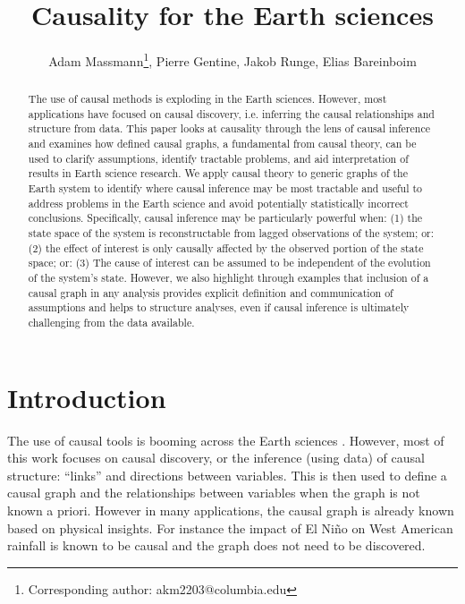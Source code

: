 \documentclass[12pt]{article}
\begin{document}
\title{Causality for the Earth sciences}

\author{Adam Massmann\thanks{Corresponding author:
    akm2203@columbia.edu}, Pierre Gentine, Jakob Runge, Elias Bareinboim}

\maketitle
\begin{abstract}
  The use of causal methods is exploding in the Earth
  sciences. However, most applications have focused on causal
  discovery, i.e. inferring the causal relationships and structure
  from data. This paper looks at causality through the lens of causal
  inference and examines how defined causal graphs, a fundamental from
  causal theory, can be used to clarify assumptions, identify
  tractable problems, and aid interpretation of results in Earth
  science research. We apply causal theory to generic graphs of the
  Earth system to identify where causal inference may be most
  tractable and useful to address problems in the Earth science and
  avoid potentially statistically incorrect conclusions. Specifically,
  causal inference may be particularly powerful when: (1) the state
  space of the system is reconstructable from lagged observations of
  the system; or: (2) the effect of interest is only causally affected
  by the observed portion of the state space; or: (3) The cause of
  interest can be assumed to be independent of the evolution of the
  system’s state. However, we also highlight through examples that
  inclusion of a causal graph in any analysis provides explicit
  definition and communication of assumptions and helps to structure
  analyses, even if causal inference is ultimately challenging from
  the data available.
\end{abstract}

\section{Introduction}

The use of causal tools is booming across the Earth sciences
\citep[e.g.,][]{salvucci2002, ebert-uphoff2012,
  samarasinghe-casuality,runge-causal-timeseries,runge2019inferring,goodwell-causality-2020}. However,
most of this work focuses on causal discovery, or the inference (using
data) of causal structure: ``links'' and directions between
variables. This is then used to define a causal graph and the
relationships between variables when the graph is not known a
priori. However in many applications, the causal graph is already
known based on physical insights. For instance the impact of El Niño
on West American rainfall is known to be causal and the graph does not
need to be discovered.
\end{document}
